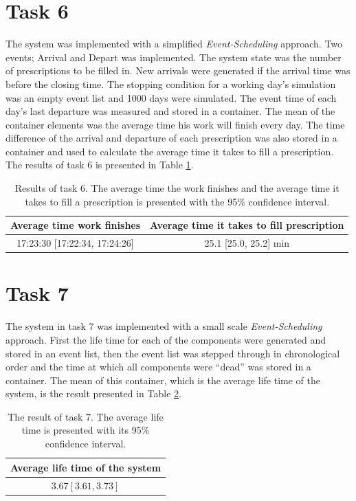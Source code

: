 \documentclass[]{article}
\begin{document}
\section{Task 6}
The system was implemented with a simplified {\it Event-Scheduling} approach.
Two events; Arrival and Depart was implemented.
The system state was the number of prescriptions to be filled in.
New arrivals were generated if the arrival time was before the closing time.
The stopping condition for a working day's simulation was an empty event list and 1000 days were simulated.
The event time of each day's last departure was measured and stored in a container.
The mean of the container elements was the average time his work will finish every day.
The time difference of the arrival and departure of each prescription was also stored in a container and used to calculate the average time it takes to fill a prescription.
The results of task 6 is presented in Table \ref{tab:task6}.

\begin{table}[H]
  \centering
  \caption{Results of task 6. The average time the work finishes and the average time it takes to fill a prescription is presented with the 95\% confidence interval.}
  \begin{tabular}{c | c}
    Average time work finishes & Average time it takes to fill prescription \\ \hline
    17:23:30 [17:22:34, 17:24:26] & 25.1 [25.0, 25.2]  min
  \end{tabular}
  \label{tab:task6}
\end{table}

\section{Task 7}
The system in task 7 was implemented with a small scale {\it Event-Scheduling} approach.
First the life time for each of the components were generated and stored in an event list, then the event list was stepped through in chronological order and the time at which all components were ``dead'' was stored in a container.
The mean of this container, which is the average life time of the system, is the result presented in Table \ref{tab:task7}.
\begin{table}[H]
  \centering
  \caption{The result of task 7. The average life time is presented with its 95\% confidence interval.}
  \begin{tabular}{c}
    Average life time of the system \\ \hline
    $3.67 [3.61, 3.73]$
  \end{tabular}
  \label{tab:task7}
\end{table}
\end{document}
